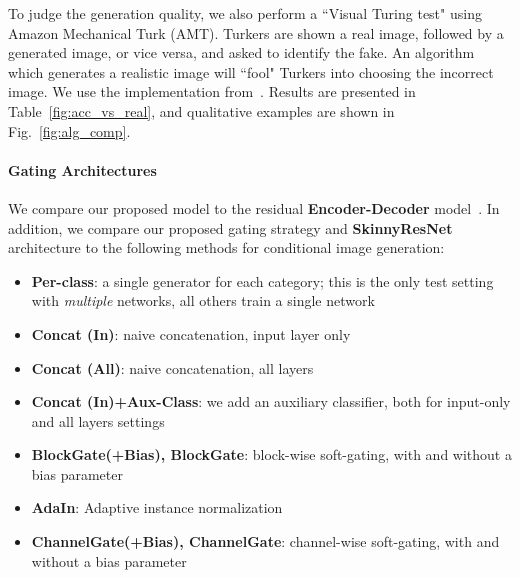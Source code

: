 To judge the generation quality, we also perform a ``Visual Turing test" using Amazon Mechanical Turk (AMT). Turkers are shown a real image, followed by a generated image, or vice versa, and asked to identify the fake. An algorithm which generates a realistic image will ``fool" Turkers into choosing the incorrect image. We use the implementation from~\cite{zhang2016colorful}.
Results are presented in Table~\ref{fig:acc_vs_real}, and qualitative examples are shown in Fig.~\ref{fig:alg_comp}.



\paragraph{Gating Architectures}
We compare our proposed model to the residual \textbf{Encoder-Decoder} model~\cite{huang2018multimodal}.
In addition, we compare our proposed gating strategy and {\bf SkinnyResNet} architecture to the following methods for  conditional image generation:

\begin{itemize}[noitemsep,leftmargin=12pt]
	\item{\bf Per-class}: a single generator for each category; this is the only test setting with \textit{multiple} networks, all others train a single network
	\item{\bf Concat (In)}: naive concatenation, input layer only
	\item{\bf Concat (All)}: naive concatenation, all layers
	\item{\bf Concat (In)+Aux-Class}: we add an auxiliary classifier, both for input-only and all layers settings
	\item{\bf BlockGate(+Bias), BlockGate}: block-wise soft-gating, with and without a bias parameter
	\item{\bf AdaIn}: Adaptive instance normalization
	\item{\bf ChannelGate(+Bias), ChannelGate}: channel-wise soft-gating, with and without a bias parameter
\end{itemize}
\vspace{-2mm}


